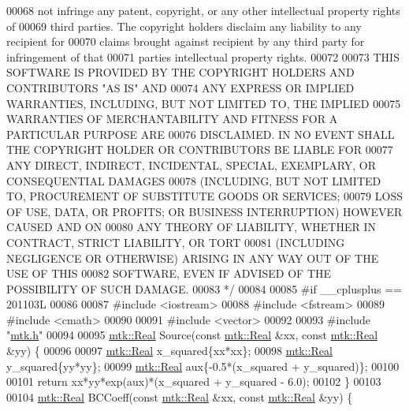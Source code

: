 \begin{DoxyCode}
00068 \textcolor{comment}{not infringe any patent, copyright, or any other intellectual property rights of}
00069 \textcolor{comment}{third parties. The copyright holders disclaim any liability to any recipient for}
00070 \textcolor{comment}{claims brought against recipient by any third party for infringement of that}
00071 \textcolor{comment}{parties intellectual property rights.}
00072 \textcolor{comment}{}
00073 \textcolor{comment}{THIS SOFTWARE IS PROVIDED BY THE COPYRIGHT HOLDERS AND CONTRIBUTORS "AS IS" AND}
00074 \textcolor{comment}{ANY EXPRESS OR IMPLIED WARRANTIES, INCLUDING, BUT NOT LIMITED TO, THE IMPLIED}
00075 \textcolor{comment}{WARRANTIES OF MERCHANTABILITY AND FITNESS FOR A PARTICULAR PURPOSE ARE}
00076 \textcolor{comment}{DISCLAIMED. IN NO EVENT SHALL THE COPYRIGHT HOLDER OR CONTRIBUTORS BE LIABLE FOR}
00077 \textcolor{comment}{ANY DIRECT, INDIRECT, INCIDENTAL, SPECIAL, EXEMPLARY, OR CONSEQUENTIAL DAMAGES}
00078 \textcolor{comment}{(INCLUDING, BUT NOT LIMITED TO, PROCUREMENT OF SUBSTITUTE GOODS OR SERVICES;}
00079 \textcolor{comment}{LOSS OF USE, DATA, OR PROFITS; OR BUSINESS INTERRUPTION) HOWEVER CAUSED AND ON}
00080 \textcolor{comment}{ANY THEORY OF LIABILITY, WHETHER IN CONTRACT, STRICT LIABILITY, OR TORT}
00081 \textcolor{comment}{(INCLUDING NEGLIGENCE OR OTHERWISE) ARISING IN ANY WAY OUT OF THE USE OF THIS}
00082 \textcolor{comment}{SOFTWARE, EVEN IF ADVISED OF THE POSSIBILITY OF SUCH DAMAGE.}
00083 \textcolor{comment}{*/}
00084 
00085 \textcolor{preprocessor}{#if \_\_cplusplus == 201103L}
00086 
00087 \textcolor{preprocessor}{#include <iostream>}
00088 \textcolor{preprocessor}{#include <fstream>}
00089 \textcolor{preprocessor}{#include <cmath>}
00090 
00091 \textcolor{preprocessor}{#include <vector>}
00092 
00093 \textcolor{preprocessor}{#include "\hyperlink{mtk_8h}{mtk.h}"}
00094 
00095 \hyperlink{group__c01-roots_gac080bbbf5cbb5502c9f00405f894857d}{mtk::Real} Source(\textcolor{keyword}{const} \hyperlink{group__c01-roots_gac080bbbf5cbb5502c9f00405f894857d}{mtk::Real} &xx, \textcolor{keyword}{const} \hyperlink{group__c01-roots_gac080bbbf5cbb5502c9f00405f894857d}{mtk::Real} &yy) \{
00096 
00097   \hyperlink{group__c01-roots_gac080bbbf5cbb5502c9f00405f894857d}{mtk::Real} x\_squared\{xx*xx\};
00098   \hyperlink{group__c01-roots_gac080bbbf5cbb5502c9f00405f894857d}{mtk::Real} y\_squared\{yy*yy\};
00099   \hyperlink{group__c01-roots_gac080bbbf5cbb5502c9f00405f894857d}{mtk::Real} aux\{-0.5*(x\_squared + y\_squared)\};
00100 
00101   \textcolor{keywordflow}{return} xx*yy*exp(aux)*(x\_squared + y\_squared - 6.0);
00102 \}
00103 
00104 \hyperlink{group__c01-roots_gac080bbbf5cbb5502c9f00405f894857d}{mtk::Real} BCCoeff(\textcolor{keyword}{const} \hyperlink{group__c01-roots_gac080bbbf5cbb5502c9f00405f894857d}{mtk::Real} &xx, \textcolor{keyword}{const} \hyperlink{group__c01-roots_gac080bbbf5cbb5502c9f00405f894857d}{mtk::Real} &yy) \{

\end{DoxyCode}
